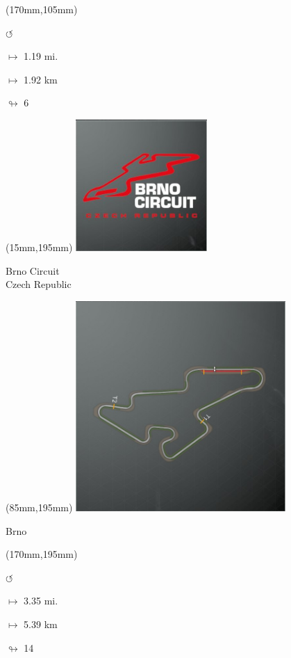 \begin{textblock*}{30mm}(170mm,105mm)%
\par \Huge$\circlearrowleft$
\Large
\par$\mapsto$ 1.19 mi.
\par$\mapsto$ 1.92 km
\par$\looparrowright$ 6
\end{textblock*}
\begin{textblock*}{60mm}(15mm,195mm)%
\includegraphics[width=50mm]{LG/2015-05-20_00075.png}
\par Brno Circuit\\ Czech Republic
\end{textblock*}
\begin{textblock*}{80mm}(85mm,195mm)%
\includegraphics[width=80mm]{TR/2015-05-20_00009.png}
\centerline{Brno}
\end{textblock*}
\begin{textblock*}{30mm}(170mm,195mm)%
\par \Huge$\circlearrowleft$
\Large
\par$\mapsto$ 3.35 mi.
\par$\mapsto$ 5.39 km
\par$\looparrowright$ 14
\end{textblock*}
\null\newpage

